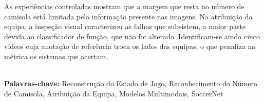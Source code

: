 As experiências controladas mostram que a margem que resta no número de camisola está limitada pela
informação presente nas imagens. Na atribuição da equipa, a inspeção visual caracterizou as falhas
que subsistem, a maior parte devida ao classificador de função, que não foi alterado. Identificam-se
ainda cinco vídeos cuja anotação de referência troca os lados das equipas, o que penaliza na métrica
os sistemas que acertam.

\hspace{3cm}\\
\indent
\textbf{Palavras-chave: } Reconstrução do Estado de Jogo, Reconhecimento do Número de Camisola,
Atribuição da Equipa, Modelos Multimodais, SoccerNet

